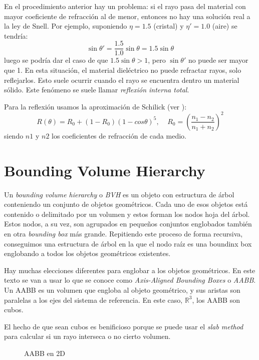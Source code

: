 \documentclass[12pt]{article}
\theoremstyle{definition}
\theoremstyle{remark}
\begin{document}
En el procedimiento anterior hay un problema: si el rayo pasa del material con mayor coeficiente de refracción al de menor, entonces no hay una solución real a la ley de Snell. Por ejemplo, suponiendo $\eta=1.5$ (cristal) y $\eta'=1.0$ (aire) se tendría:
\[
\sin\theta'=\frac{1.5}{1.0}\sin\theta=1.5\sin\theta
\]
luego se podría dar el caso de que $1.5\sin\theta>1$, pero $\sin\theta'$ no puede ser mayor que 1. En esta situación, el material dieléctrico no puede refractar rayos, solo reflejarlos. Esto suele ocurrir cuando el rayo se encuentra dentro un material sólido. Este fenómeno se suele llamar \textit{reflexión interna total}.

Para la reflexión usamos la aproximación de Schilick (ver \cite{schlickapproximation}):
\[
R(\theta)=R_0+(1-R_0)(1-cos\theta)^5, \;\;\;\; R_0=\left(\frac{n_1-n_2}{n_1+n_2}\right)^2
\]
siendo $n1$ y $n2$ los coeficientes de refracción de cada medio.

\section{Bounding Volume Hierarchy}

Un \textit{bounding volume hierarchy} o \textit{BVH} es un objeto con estructura de árbol conteniendo un conjunto de objetos geométricos. Cada uno de esos objetos está contenido o delimitado por un volumen y estos forman los nodos hoja del árbol. Estos nodos, a su vez, son agrupados en pequeños conjuntos englobados también en otra \textit{bounding box} más grande. Repitiendo este proceso de forma recursiva, conseguimos una estructura de árbol en la que el nodo raíz es una boundinx box englobando a todos los objetos geométricos existentes.

Hay muchas elecciones diferentes para englobar a los objetos geométricos. En este texto se van a usar lo que se conoce como \textit{Axis-Aligned Bounding Boxes} o \textit{AABB}. Un AABB es un volumen que engloba al objeto geométrico, y sus aristas son paralelas a los ejes del sistema de referencia. En este caso, $\mathbb{R}^3$, los AABB son cubos.

El hecho de que sean cubos es benificioso porque se puede usar el \textit{slab method} para calcular si un rayo interseca o no cierto volumen.

\begin{figure}[H]
\centering
{}
\caption{AABB en 2D}
\end{figure}
\end{document}
